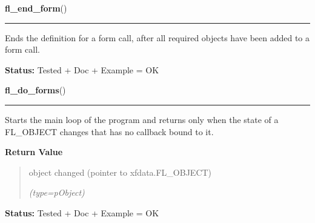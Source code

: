     \label{xformslib:library:fl_end_form}

    \vspace{0.5ex}

\hspace{.8\funcindent}\begin{boxedminipage}{\funcwidth}

    \raggedright \textbf{fl\_end\_form}()

    \vspace{-1.5ex}

    \rule{\textwidth}{0.5\fboxrule}
\setlength{\parskip}{2ex}
    Ends the definition for a form call, after all required objects have 
    been added to a form call.

\setlength{\parskip}{1ex}
\textbf{Status:} Tested + Doc + Example = OK



    \end{boxedminipage}

    \label{xformslib:library:fl_do_forms}

    \vspace{0.5ex}

\hspace{.8\funcindent}\begin{boxedminipage}{\funcwidth}

    \raggedright \textbf{fl\_do\_forms}()

    \vspace{-1.5ex}

    \rule{\textwidth}{0.5\fboxrule}
\setlength{\parskip}{2ex}
    Starts the main loop of the program and returns only when the state of 
    a FL\_OBJECT changes that has no callback bound to it.

\setlength{\parskip}{1ex}
      \textbf{Return Value}
    \vspace{-1ex}

      \begin{quote}
      object changed (pointer to xfdata.FL\_OBJECT)

      {\it (type=pObject)}

      \end{quote}

\textbf{Status:} Tested + Doc + Example = OK



    \end{boxedminipage}

